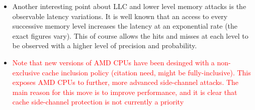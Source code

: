 \begin{itemize}
		\item Another interesting point about LLC and lower level memory attacks is the observable latency variations. It is well known that an access to every successive memory level increases the latency at an exponential rate (the exact figures vary). This of course allows the hits and misses at each level to be observed with a higher level of precision and probability. 
		\item \textcolor{red}{Note that new versions of AMD CPUs have been desinged with a non-exclusive cache inclusion policy (citation need, might be fully-inclusive). This exposes AMD CPUs to further, more advanced side-channel attacks. The main reason for this move is to improve performance, and it is clear that cache side-channel protection is not currently a priority}
	\end{itemize}
	
